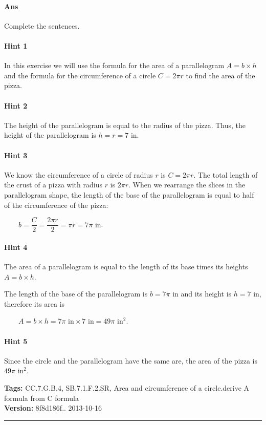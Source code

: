\documentclass[twocolumn,10pt]{article}
\begin{document}
\paragraph{Ans} Complete the sentences. 

\paragraph{Hint 1}In this exercise we will use the formula for the area of a parallelogram $A=b\times h$ and the formula for the circumference of a circle $C=2\pi r$ to find the area of the pizza.

\paragraph{Hint 2}The height of the parallelogram is equal to the radius  of the pizza. Thus, the height of the parallelogram is $h=r=7\text{ in}$.

\paragraph{Hint 3}We know the circumference of a circle of radius $r$ is $C=2\pi r$. The total length of the crust of a pizza with radius $r$ is $2\pi r$. When we rearrange the slices in the parallelogram shape, the length of the base of the parallelogram is equal to half of the circumference of the pizza:

$\qquad b = \dfrac{C}{2} = \dfrac{ 2 \pi r }{2}= \pi r=7\pi\text{ in}$.


\paragraph{Hint 4}The area of a parallelogram is equal to the length of its base times its heights $A=b\times h$.

The length of the base of the parallelogram is $b=7\pi\text{ in}$ and its height is $h=7\text{ in}$, therefore its area is 

$\qquad A= b \times h = 7\pi\text{ in}\times 7\text{ in} = 49\pi\text{ in}^2$.


\paragraph{Hint 5}Since the circle and the parallelogram have the same are, the area of the pizza is $49\pi\text{ in}^2$.




\medskip
\noindent
\textbf{Tags:} {\footnotesize CC.7.G.B.4, SB.7.1.F.2.SR, Area and circumference of a circle.derive A formula from C formula}\\
\textbf{Version:} 8f8d186f.. 2013-10-16
\smallskip\hrule
\end{document}
